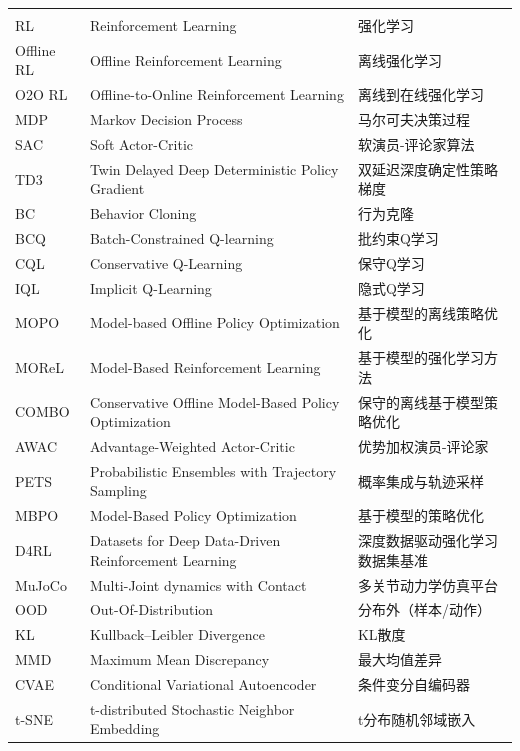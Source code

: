 \begin{denoabbre}
  \begin{supertabular}{p{2.5cm}p{8.5cm}p{8cm}}
    {\textbf{}}  &  {\textbf{}}  &   {\textbf{}}   \\
    RL   &  Reinforcement Learning  &  强化学习 \\
    Offline RL   &  Offline Reinforcement Learning  &  离线强化学习 \\
    O2O RL   &  Offline-to-Online Reinforcement Learning  &  离线到在线强化学习 \\
    MDP   &  Markov Decision Process  &  马尔可夫决策过程 \\
    SAC   &  Soft Actor-Critic  &  软演员-评论家算法 \\
    TD3   &  Twin Delayed Deep Deterministic Policy Gradient  &  双延迟深度确定性策略梯度 \\
    BC   &  Behavior Cloning  &  行为克隆 \\
    BCQ   &  Batch-Constrained Q-learning  &  批约束Q学习 \\
    CQL   &  Conservative Q-Learning  &  保守Q学习 \\
    IQL   &  Implicit Q-Learning  &  隐式Q学习 \\
    MOPO   &  Model-based Offline Policy Optimization  &  基于模型的离线策略优化 \\
    MOReL   &  Model-Based Reinforcement Learning  &  基于模型的强化学习方法 \\
    COMBO   &  Conservative Offline Model-Based Policy Optimization  &  保守的离线基于模型策略优化 \\
    AWAC   &  Advantage-Weighted Actor-Critic  &  优势加权演员-评论家 \\
    PETS   &  Probabilistic Ensembles with Trajectory Sampling  &  概率集成与轨迹采样 \\
    MBPO   &  Model-Based Policy Optimization  &  基于模型的策略优化 \\
    D4RL   &  Datasets for Deep Data-Driven Reinforcement Learning  &  深度数据驱动强化学习数据集基准 \\
    MuJoCo   &  Multi-Joint dynamics with Contact  &  多关节动力学仿真平台 \\
    OOD   &  Out-Of-Distribution  &  分布外（样本/动作） \\
    KL   &  Kullback--Leibler Divergence  &  KL散度 \\
    MMD   &  Maximum Mean Discrepancy  &  最大均值差异 \\
    CVAE   &  Conditional Variational Autoencoder  &  条件变分自编码器 \\
    t-SNE   &  t-distributed Stochastic Neighbor Embedding  &  t分布随机邻域嵌入 \\


  \end{supertabular}

\end{denoabbre}


